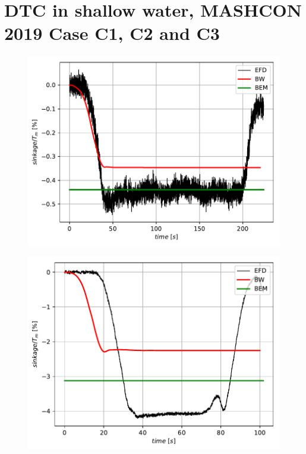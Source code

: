 \documentclass[]{book}
\begin{document}
\section{DTC in shallow water, MASHCON 2019 Case C1, C2 and C3}
\begin{figure}
	\centering
	\includegraphics[width=0.9\linewidth]{figures/Example04_MASHCON2019_DTC_C1_Sinkage}
	\caption{}
	\label{fig:example04mashcon2019dtcc1sinkage}
\end{figure}
\begin{figure}
	\centering
	\includegraphics[width=0.9\linewidth]{figures/Example04_MASHCON2019_DTC_C2_Sinkage}
	\caption{}
	\label{fig:example04mashcon2019dtcc1sinkage}
\end{figure}
\end{document}
